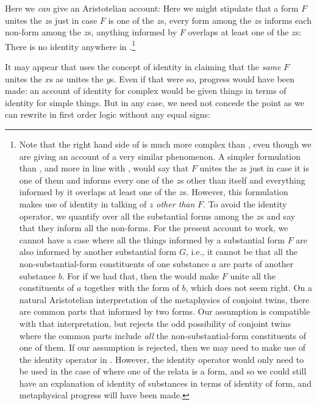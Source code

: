 Here we \textit{can} give an Aristotelian account:
Here we might stipulate that a form $F$ unites the $z$s just in case $F$ is one of 
the $z$s, every form among the $z$s informs 
each non-form among the $z$s, anything informed  by $F$ overlaps at least one of the $z$s:
There is no identity anywhere in .\footnote{Note that the right hand side of 
 is much more complex than , even though we are giving an account of a 
very similar phenomenon. A simpler formulation than , and more in line with , 
would say that $F$ unites the $z$s just in case it is one of them and informs every one of the $z$s other 
than itself and everything informed by it overlaps at least one of the $z$s. However, this formulation 
makes use of identity in talking of $z$ \textit{other than} $F$. To avoid the identity operator, we 
quantify over all the substantial forms among the $z$s and say that they inform all the non-forms. 
For the present account to work, we cannot have a case where all the things informed by a substantial
form $F$ are also informed by another substantial form $G$, i.e., it cannot be that all the non-substantial-form 
constituents of one substance $a$ are parts of another substance $b$. For if we had that, then the 
 would make $F$ unite all the constituents of $a$ together with the form of $b$, which does not
seem right. On a natural Aristotelian interpretation of the metaphysics of conjoint twins, there are common
parts that informed by two forms. Our assumption is compatible with that interpretation, but rejects the odd
possibility of conjoint twins where the common parts include \textit{all} the non-substantial-form constituents
of one of them. If our assumption is rejected, then we may need to make use of the identity operator in .
However, the identity operator would only need to be used in the case of where one of the relata is a form, and so 
we could still have an explanation of identity of substances in terms of identity of form, and metaphysical
progress will have been made.}

It may appear that  uses the concept of identity in claiming 
that the \textit{same} $F$ unites the $x$s as unites the $y$s. Even if that were so,
progress would have been made: an account of identity for complex would be given things 
in terms of identity for simple things. But in any case, we need not concede the point
as we can rewrite  in first order logic without any equal signs:


